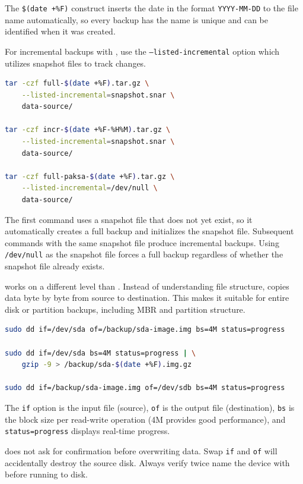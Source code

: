 The \texttt{\$(date +\%F)} construct inserts the date in the format
\texttt{YYYY-MM-DD} to the file name automatically, so every backup has
the name is unique and can be identified when it was created.

For incremental backups with , use the \texttt{--listed-incremental} option which utilizes snapshot files to track changes.

\begin{lstlisting}[language=bash, caption={Incremental backup with file snapshots}]
tar -czf full-$(date +%F).tar.gz \
    --listed-incremental=snapshot.snar \
    data-source/

tar -czf incr-$(date +%F-%H%M).tar.gz \
    --listed-incremental=snapshot.snar \
    data-source/

tar -czf full-paksa-$(date +%F).tar.gz \
    --listed-incremental=/dev/null \
    data-source/
\end{lstlisting}

The first command uses a snapshot file that does not yet exist, so it automatically creates a full backup and initializes the snapshot file. Subsequent commands with the same snapshot file produce incremental backups. Using \texttt{/dev/null} as the snapshot file forces a full backup regardless of whether the snapshot file already exists.

 works on a different level than . Instead of understanding
file structure, \cmd{dd} copies data byte by byte from source to destination. This makes it suitable for entire disk or partition backups, including MBR and partition structure.

\begin{lstlisting}[language=bash, caption={Use dd for disk backup}]
sudo dd if=/dev/sda of=/backup/sda-image.img bs=4M status=progress

sudo dd if=/dev/sda bs=4M status=progress | \
    gzip -9 > /backup/sda-$(date +%F).img.gz

sudo dd if=/backup/sda-image.img of=/dev/sdb bs=4M status=progress
\end{lstlisting}

The \texttt{if} option is the input file (source), \texttt{of} is the output file (destination), \texttt{bs} is the block size per read-write operation (4M provides good performance), and \texttt{status=progress} displays real-time progress.

\begin{warningbox}
 does not ask for confirmation before overwriting data. Swap \texttt{if} and
\texttt{of} will accidentally destroy the source disk. Always verify
twice name the device with  before running  to disk.
\end{warningbox}


